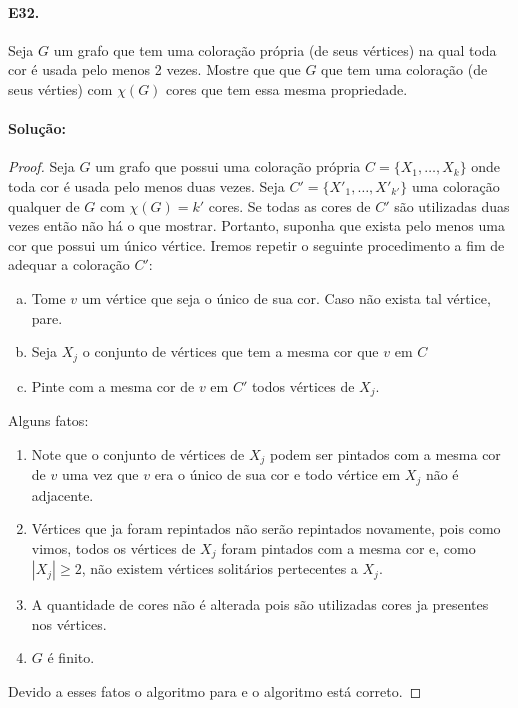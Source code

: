 \documentclass[11pt,a4paper,notitlepage]{exam}
\begin{document}
\paragraph*{E32.} Seja $G$ um grafo que tem uma coloração própria
(de seus vértices) na qual toda cor é usada pelo menos 2 vezes. Mostre que
que $G$ que tem uma coloração (de seus vérties) com $\chi(G)$ cores
que tem essa mesma propriedade.

\paragraph{Solução:}
\begin{proof}
    Seja $G$ um grafo que possui uma coloração própria  $C =
    \{X_1,\dots, X_k \}$ onde toda cor é usada pelo menos duas vezes.
    Seja $C' = \{X'_1,\dots, X'_{k'} \}$ uma coloração qualquer de $G$
    com $\chi(G) = k'$ cores. Se todas as cores de $C'$ são utilizadas
    duas vezes então não há o que mostrar. Portanto, suponha que exista
    pelo menos uma cor que possui um único vértice. Iremos repetir o
    seguinte procedimento a fim de adequar a coloração $C'$:
    \begin{enumerate}[a)]
        \item Tome $v$ um vértice que seja o único de sua cor. Caso não
            exista tal vértice, pare.
        \item Seja $X_j$ o conjunto de vértices que tem a mesma cor
            que $v$ em $C$
        \item Pinte com a mesma cor de $v$ em $C'$ todos vértices de $X_j$.   
    \end{enumerate}
    Alguns fatos:
    \begin{enumerate}
        \item Note que o conjunto de vértices de $X_j$ podem ser pintados com a
         mesma cor de $v$ uma vez que $v$ era o único de sua cor e todo
         vértice em $X_j$ não é adjacente.
        \item Vértices que ja foram repintados não serão repintados
            novamente, pois como vimos, todos os vértices de $X_j$ foram
            pintados com a mesma cor e, como $|X_j| \geq 2$, não existem vértices
            solitários pertecentes a $X_j$.
        \item A quantidade de cores não é alterada pois são utilizadas
            cores ja presentes nos vértices.
        \item $G$ é finito.
    \end{enumerate}
    Devido a esses fatos o algoritmo para e o algoritmo está
    correto.


\end{proof}
\end{document}
